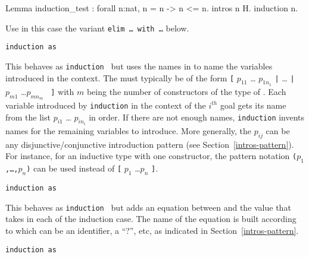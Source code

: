\begin{coq_example*}
\begin{itemize}
\end{itemize}

\Example

\begin{coq_example}
Lemma induction_test : forall n:nat, n = n -> n <= n.
intros n H.
induction n.
\end{coq_example}

\begin{ErrMsgs}
\item {}
\item {}

  Use in this case
  the variant {\tt elim \dots\ with \dots} below.
\end{ErrMsgs}

\begin{Variants}
\item{\tt induction {\term} as {\disjconjintropattern}}

  This behaves as {\tt induction {\term}} but uses the names in
  {\disjconjintropattern} to name the variables introduced in the context.
  The {\disjconjintropattern} must typically be of the form
  {\tt [} $p_{11}$ \ldots
  $p_{1n_1}$ {\tt |} {\ldots} {\tt |} $p_{m1}$ \ldots $p_{mn_m}$ {\tt
    ]} with $m$ being the number of constructors of the type of
  {\term}. Each variable introduced by {\tt induction} in the context
  of the $i^{th}$ goal gets its name from the list $p_{i1}$ \ldots
  $p_{in_i}$ in order. If there are not enough names, {\tt induction}
  invents names for the remaining variables to introduce. More
  generally, the $p_{ij}$ can be any disjunctive/conjunctive
  introduction pattern (see Section~\ref{intros-pattern}). For instance,
  for an inductive type with one constructor, the pattern notation
  {\tt ($p_{1}$,\ldots,$p_{n}$)} can be used instead of
  {\tt [} $p_{1}$ \ldots $p_{n}$ {\tt ]}.

\item{\tt induction {\term} as {\namingintropattern}}

  This behaves as {\tt induction {\term}} but adds an equation between
  {\term} and the value that {\term} takes in each of the induction
  case.  The name of the equation is built according to
  {\namingintropattern} which can be an identifier, a ``?'', etc, as
  indicated in Section~\ref{intros-pattern}.

\item{\tt induction {\term} as {\namingintropattern} {\disjconjintropattern}}


\end{Variants}
\end{coq_example*}
